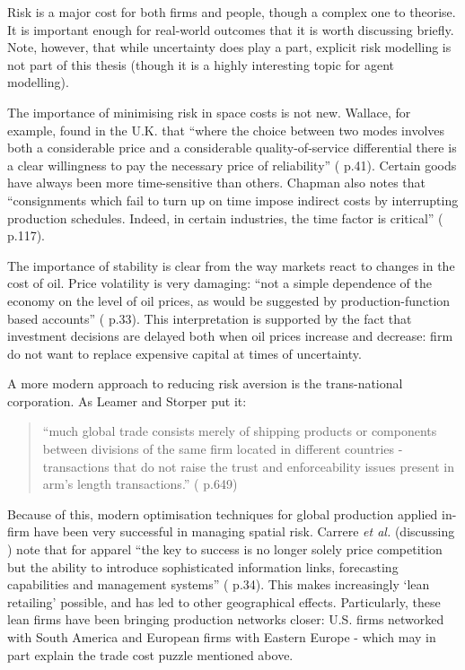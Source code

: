 {Risk is a major cost for both firms and people, though a complex one to theorise. It is important enough for real-world outcomes that it is worth discussing briefly. Note, however, that while uncertainty does play a part, explicit risk modelling is not part of this thesis (though it is a highly interesting topic for agent modelling).

The importance of minimising risk in space costs is not new. Wallace, for example, found in the U.K. that ``where the choice between two modes involves both a considerable price and a considerable quality-of-service differential there is a clear willingness to pay the necessary price of reliability'' (\citealt{wallace_relationship_1974} p.41). Certain goods have always been more time-sensitive than others. Chapman also notes that ``consignments which fail to turn up on time impose indirect costs by interrupting production schedules. Indeed, in certain industries, the time factor is critical'' (\citealt{chapman_people_1979} p.117).

The importance of stability is clear from the way markets react to changes in the cost of oil. Price volatility is very damaging: ``not a simple dependence of the economy on the level of oil prices, as would be suggested by production-function based accounts'' (\citealt{hamilton_what_2003} p.33). This interpretation is supported by the fact that investment decisions are delayed both when oil prices increase and decrease: firm do not want to replace expensive capital at times of uncertainty. 

A more modern approach to reducing risk aversion is the trans-national corporation. As Leamer and Storper put it:

\begin{quote}
``much global trade consists merely of shipping products or components between divisions of the same firm located in different countries - transactions that do not raise the trust and enforceability issues present in arm's length transactions.'' (\citealt{leamer_economy_2001} p.649)
\end{quote}

Because of this, modern optimisation techniques for global production applied in-firm have been very successful in managing spatial risk. Carrere \emph{et al.} (discussing \citealt{abernathy_stitch_1999}) note that for apparel ``the key to success is no longer solely price competition but the ability to introduce sophisticated information links, forecasting capabilities and management systems'' (\citealt{carrere_distance_2009} p.34). This makes increasingly `lean retailing' possible, and has led to other geographical effects. Particularly, these lean firms have been bringing production networks closer: U.S. firms networked with South America and European firms with Eastern Europe - which may in part explain the trade cost puzzle mentioned above.

}
